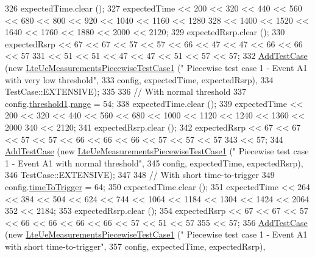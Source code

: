 \begin{DoxyCode}
326   expectedTime.clear ();
327   expectedTime << 200 << 320 << 440 << 560 << 680 << 800 << 920 << 1040 << 1160 << 1280
328                << 1400 << 1520 << 1640 << 1760 << 1880 << 2000 << 2120;
329   expectedRsrp.clear ();
330   expectedRsrp << 67 << 67 << 57 << 57 << 66 << 47 << 47 << 66 << 66 << 57
331                << 51 << 51 << 47 << 47 << 51 << 57 << 57;
332   \hyperlink{classns3_1_1TestCase_a3718088e3eefd5d6454569d2e0ddd835}{AddTestCase} (\textcolor{keyword}{new} \hyperlink{classLteUeMeasurementsPiecewiseTestCase1}{LteUeMeasurementsPiecewiseTestCase1} (\textcolor{stringliteral}{"
      Piecewise test case 1 - Event A1 with very low threshold"},
333                                                         config, expectedTime, expectedRsrp),
334                TestCase::EXTENSIVE);
335 
336   \textcolor{comment}{// With normal threshold}
337   config.\hyperlink{structns3_1_1LteRrcSap_1_1ReportConfigEutra_a8f36bc45a61054920e490be8bf33b4ca}{threshold1}.\hyperlink{structns3_1_1LteRrcSap_1_1ThresholdEutra_abd4950e20a1a93727535e8364bf85b03}{range} = 54;
338   expectedTime.clear ();
339   expectedTime << 200 << 320 << 440 << 560 << 680 << 1000 << 1120 << 1240 << 1360 << 2000
340                << 2120;
341   expectedRsrp.clear ();
342   expectedRsrp << 67 << 67 << 57 << 57 << 66 << 66 << 66 << 57 << 57 << 57
343                << 57;
344   \hyperlink{classns3_1_1TestCase_a3718088e3eefd5d6454569d2e0ddd835}{AddTestCase} (\textcolor{keyword}{new} \hyperlink{classLteUeMeasurementsPiecewiseTestCase1}{LteUeMeasurementsPiecewiseTestCase1} (\textcolor{stringliteral}{"
      Piecewise test case 1 - Event A1 with normal threshold"},
345                                                         config, expectedTime, expectedRsrp),
346                TestCase::EXTENSIVE);
347 
348   \textcolor{comment}{// With short time-to-trigger}
349   config.\hyperlink{structns3_1_1LteRrcSap_1_1ReportConfigEutra_aee64b76b166b1beda5bbe1760363ed24}{timeToTrigger} = 64;
350   expectedTime.clear ();
351   expectedTime << 264 << 384 << 504 << 624 << 744 << 1064 << 1184 << 1304 << 1424 << 2064
352                << 2184;
353   expectedRsrp.clear ();
354   expectedRsrp << 67 << 67 << 57 << 66 << 66 << 66 << 66 << 57 << 51 << 57
355                << 57;
356   \hyperlink{classns3_1_1TestCase_a3718088e3eefd5d6454569d2e0ddd835}{AddTestCase} (\textcolor{keyword}{new} \hyperlink{classLteUeMeasurementsPiecewiseTestCase1}{LteUeMeasurementsPiecewiseTestCase1} (\textcolor{stringliteral}{"
      Piecewise test case 1 - Event A1 with short time-to-trigger"},
357                                                         config, expectedTime, expectedRsrp),

\end{DoxyCode}
